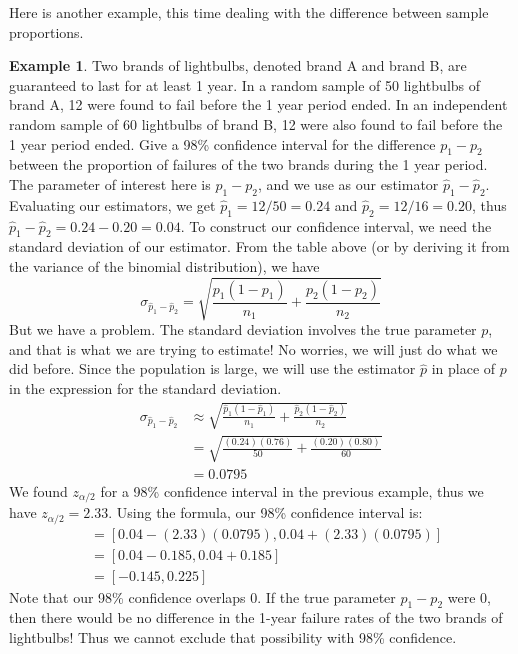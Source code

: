 \documentclass[12pt]{article}
\theoremstyle{definition}
\newtheorem*{example}{Example}
\theoremstyle{remark}
\begin{document}
Here is another example, this time dealing with the difference between sample proportions.

\begin{example}Two brands of lightbulbs, denoted brand A and brand B, are guaranteed to last for at least 1 year. In a random sample of 50 lightbulbs of brand A, 12 were found to fail before the 1 year period ended. In an independent random sample of 60 lightbulbs of brand B, 12 were also found to fail before the 1 year period ended. Give a 98\% confidence interval for the difference $p_1 - p_2$ between the proportion of failures of the two brands during the 1 year period.\\

The parameter of interest here is $p_1 - p_2$, and we use as our estimator $\hat{p}_1 - \hat{p}_2$. Evaluating our estimators, we get $\hat{p}_1 = 12/50 = 0.24$ and $\hat{p}_2 = 12/16 = 0.20$, thus $\hat{p}_1 - \hat{p}_2 = 0.24 - 0.20 = 0.04$. To construct our confidence interval, we need the standard deviation of our estimator. From the table above (or by deriving it from the variance of the binomial distribution), we have
\[
\sigma_{\hat{p}_1 - \hat{p}_2} = \sqrt{\frac{p_1(1-p_1)}{n_1} +\frac{p_2(1-p_2)}{n_2} }
\]
But we have a problem. The standard deviation involves the true parameter $p$, and that is what we are trying to estimate! No worries, we will just do what we did before. Since the population is large, we will use the estimator $\hat{p}$ in place of $p$ in the expression for the standard deviation.
\begin{align*}
\sigma_{\hat{p}_1 - \hat{p}_2} &\approx \sqrt{\frac{\hat{p}_1(1-\hat{p}_1)}{n_1} +\frac{\hat{p}_2(1-\hat{p}_2)}{n_2} } \\
&= \sqrt{\frac{(0.24)(0.76)}{50} +\frac{(0.20)(0.80)}{60} }\\
&= 0.0795 
\end{align*}
We found $z_{\alpha/2}$ for a 98\% confidence interval in the previous example, thus we have $z_{\alpha/2} = 2.33$. Using the formula, our 98\% confidence interval is:
\begin{align*}
[ (\hat{p}_1 - \hat{p}_2) - z_{\alpha/2} \sigma_{\hat{p}_1 - \hat{p}_2}, (\hat{p}_1 - \hat{p}_2) + z_{\alpha/2} \sigma_{\hat{p}_1 - \hat{p}_2} ] &= [ 0.04 - (2.33)(0.0795), 0.04 + (2.33)(0.0795)] \\
&= [ 0.04 - 0.185, 0.04 + 0.185] \\
&= [-0.145, 0.225]
\end{align*}
Note that our 98\% confidence overlaps 0. If the true parameter $p_1 - p_2$ were 0, then there would be no difference in the 1-year failure rates of the two brands of lightbulbs! Thus we cannot exclude that possibility with 98\% confidence.
\end{example}
\end{document}
